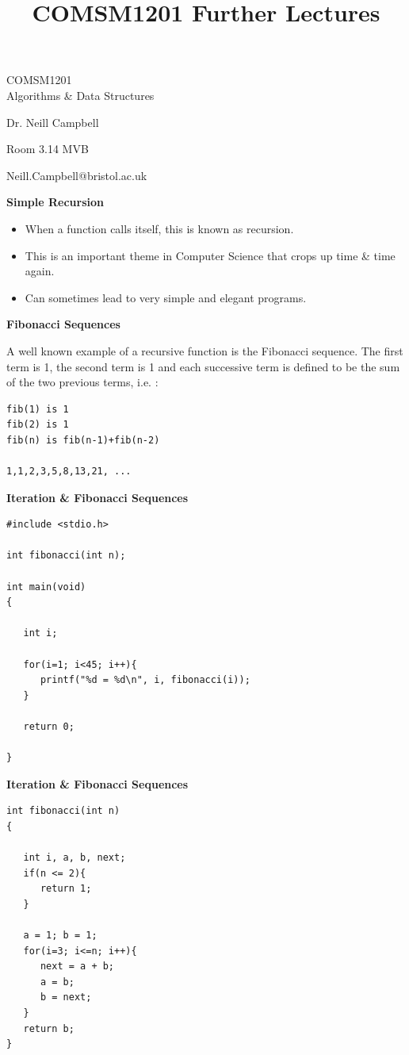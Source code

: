 \documentclass[a4,portraitt]{slides}
\title{COMSM1201 Further Lectures}
\begin{document}
\begin{center}
{\Large
COMSM1201\\
Algorithms \& Data Structures
}

Dr. Neill Campbell

Room 3.14 MVB

Neill.Campbell@bristol.ac.uk\\[1cm]

\end{center}

\newpage
{\samepage
{\Large
\begin{center}
{\Large{\bf Simple Recursion}}
\end{center}
\begin{itemize}
\item  When a function calls itself, this is known as recursion.
\item This is an important theme in Computer Science that crops up
time \& time again.
\item Can sometimes lead to very simple and elegant programs.
\end{itemize}
}
}

\newpage
{\samepage
{\large
\begin{center}
{\Large{\bf Fibonacci Sequences}}
\end{center}
A well known example of a recursive function is the Fibonacci
sequence. The first term is 1, the second term is 1 and each
successive term is defined to be the sum of the two previous
terms, i.e. :
\begin{verbatim}
fib(1) is 1
fib(2) is 1
fib(n) is fib(n-1)+fib(n-2)

1,1,2,3,5,8,13,21, ...
\end{verbatim}
}
}

\newpage
{\samepage
\begin{center}
{\Large{\bf Iteration \& Fibonacci Sequences}}
\end{center}
\begin{verbatim}
#include <stdio.h>

int fibonacci(int n);

int main(void)
{

   int i;

   for(i=1; i<45; i++){
      printf("%d = %d\n", i, fibonacci(i));
   }

   return 0;

}
\end{verbatim}
}

\newpage
{\samepage
\begin{center}
{\Large{\bf Iteration \& Fibonacci Sequences}}
\end{center}
\begin{verbatim}
int fibonacci(int n)
{
                                                                                          
   int i, a, b, next;
   if(n <= 2){
      return 1;
   }
                                                                                          
   a = 1; b = 1;                                                                          
   for(i=3; i<=n; i++){
      next = a + b;
      a = b;
      b = next;
   }
   return b;
}
\end{verbatim}
}
\end{document}

